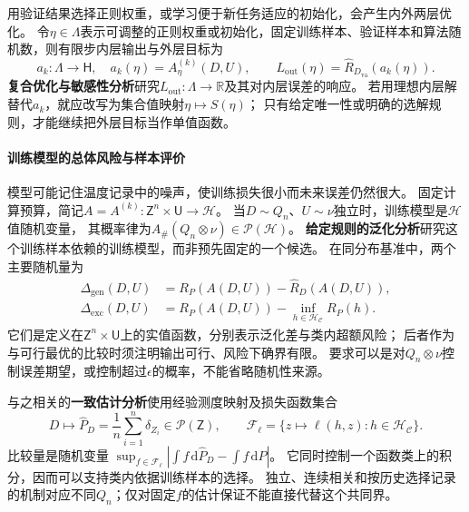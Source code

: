 用验证结果选择正则权重，或学习便于新任务适应的初始化，会产生内外两层优化。
令$\eta\in\Lambda$表示可调整的正则权重或初始化，固定训练样本、验证样本和算法随机数，则有限步内层输出与外层目标为
\[
  a_k:\Lambda\to\mathsf H,\quad a_k(\eta)=A_\eta^{(k)}(D,U),
  \qquad L_{\mathrm{out}}(\eta)=\widehat R_{D_{\mathrm{va}}}(a_k(\eta)).
\]
\textbf{复合优化与敏感性分析}研究$L_{\mathrm{out}}:\Lambda\to\mathbb R$及其对内层误差的响应。
若用理想内层解替代$a_k$，就应改写为集合值映射$\eta\mapsto S(\eta)$；
只有给定唯一性或明确的选解规则，才能继续把外层目标当作单值函数。

\paragraph{训练模型的总体风险与样本评价}
\label{sec:future-ml-generalization-evaluation}

模型可能记住温度记录中的噪声，使训练损失很小而未来误差仍然很大。
固定计算预算，简记$A=A^{(k)}:\mathsf Z^n\times\mathsf U\to\mathcal H$。
当$D\sim Q_n$、$U\sim\nu$独立时，训练模型是$\mathcal H$值随机变量，
其概率律为$A_{\#}(Q_n\otimes\nu)\in\mathcal P(\mathcal H)$。
\textbf{给定规则的泛化分析}研究这个训练样本依赖的训练模型，而非预先固定的一个候选。
在同分布基准中，两个主要随机量为
\[
  \begin{aligned}
    \Delta_{\mathrm{gen}}(D,U)
      &=R_P(A(D,U))-\widehat R_D(A(D,U)),\\
    \Delta_{\mathrm{exc}}(D,U)
      &=R_P(A(D,U))-\inf_{h\in\mathcal H_{\mathcal C}}R_P(h).
  \end{aligned}
\]
它们是定义在$\mathsf Z^n\times\mathsf U$上的实值函数，分别表示泛化差与类内超额风险；
后者作为与可行最优的比较时须注明输出可行、风险下确界有限。
要求可以是对$Q_n\otimes\nu$控制误差期望，或控制超过$\epsilon$的概率，不能省略随机性来源。

与之相关的\textbf{一致估计分析}使用经验测度映射及损失函数集合
\[
  D\mapsto\widehat P_D=\frac1n\sum_{i=1}^n\delta_{Z_i}
     \in\mathcal P(\mathsf Z),\qquad
  \mathcal F_\ell=\{z\mapsto\ell(h,z):h\in\mathcal H_{\mathcal C}\}.
\]
比较量是随机变量
$\sup_{f\in\mathcal F_\ell}|\int f\,\mathrm d\widehat P_D-\int f\,\mathrm dP|$。
它同时控制一个函数类上的积分，因而可以支持类内依据训练样本的选择。
独立、连续相关和按历史选择记录的机制对应不同$Q_n$；仅对固定$f$的估计保证不能直接代替这个共同界。

